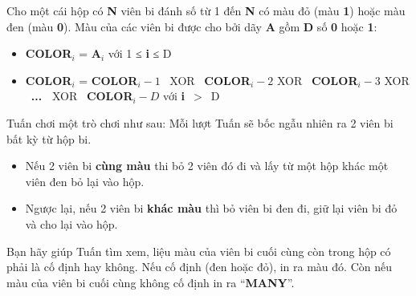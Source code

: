 Cho một cái hộp có \textbf{N} viên bi đánh số từ 1 đến \textbf{N} có màu đỏ (màu \textbf{1}) hoặc màu đen (màu \textbf{0}). Màu của các viên bi được cho bởi dãy \textbf{A} gồm \textbf{D} số \textbf{0} hoặc \textbf{1}:
\begin{itemize}
	\item \textbf{\textbf{COLOR$_i$}} = \textbf{A$_i$} với 1 ≤ \textbf{i} ≤ D
	\item \textbf{COLOR$_i$} = \textbf{COLOR$_i - 1$}  XOR  \textbf{COLOR$_i - 2 $} XOR  \textbf{COLOR$_i - 3 $} XOR  \textbf{... } XOR  \textbf{COLOR$_i - D$} với \textbf{i} $>$ D
\end{itemize}

Tuấn chơi một trò chơi như sau: Mỗi lượt Tuấn sẽ bốc ngẫu nhiên ra 2 viên bi bất kỳ từ hộp bi.
\begin{itemize}
	\item Nếu 2 viên bi \textbf{cùng màu} thi bỏ 2 viên đó đi và lấy từ một hộp khác một viên đen bỏ lại vào hộp.
	\item Ngược lại, nếu 2 viên bi \textbf{khác màu} thì bỏ viên bi đen đi, giữ lại viên bi đỏ và cho lại vào hộp.
\end{itemize}

Bạn hãy giúp Tuấn tìm xem, liệu màu của viên bi cuối cùng còn trong hộp có phải là cố định hay không. Nếu cố định (đen hoặc đỏ), in ra màu đó. Còn nếu màu của viên bi cuối cùng không cố định in ra “\textbf{MANY}”.
